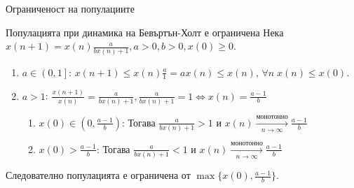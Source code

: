 
\begin{frame}[t]{Ограниченост на популациите}

\begin{block}{Популацията при динамика на Бевъртън-Холт е ограничена}
Нека $x(n+1)=x(n)\frac{a}{b x(n) + 1}, a > 0, b > 0,x(0) \geq 0$. \\
\begin{enumerate}[I]

\item $a \in \left(0, 1 \right]$: $x(n+1) \leq x(n)\frac{a}{1} = a x(n) \leq x(n)$, $\forall{n} \;  x \left(n \right) \leq x(0)$.


\item $a > 1$: $\frac{x(n+1)}{x(n)}=\frac{a}{b x(n) + 1}, \frac{a}{b x(n) + 1} = 1 \iff x(n) = \frac{a-1}{b}$
\begin{enumerate}

\item $x(0) \in \left(0, \frac{a-1}{b} \right)$: Тогава $\frac{a}{b x(n) + 1} > 1$ и $x(n) \xrightarrow[n \to \infty]{\text{монотонно}} \frac{a-1}{b}$

\item $x(0) > \frac{a-1}{b}$: Тогава $\frac{a}{b x(n) + 1} < 1$ и $x(n) \xrightarrow[n \to \infty]{\text{монотонно}} \frac{a-1}{b}$

\end{enumerate}


\end{enumerate}


Следователно популацията е ограничена от $\max \{x(0), \frac{a-1}{b}\}$.



\end{block}

\end{frame}



